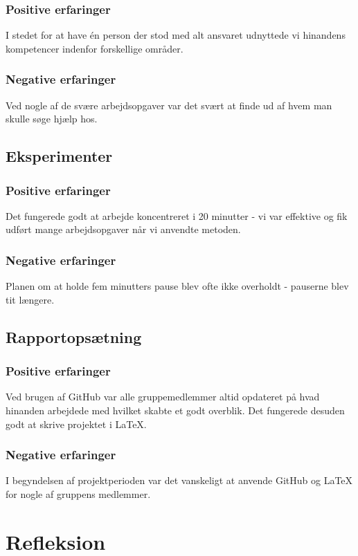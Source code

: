 \subsubsection{Positive erfaringer}
I stedet for at have én person der stod med alt ansvaret udnyttede vi hinandens kompetencer indenfor forskellige områder.

\subsubsection{Negative erfaringer}
Ved nogle af de svære arbejdsopgaver var det svært at finde ud af hvem man skulle søge hjælp hos.

\subsection{Eksperimenter}

\subsubsection{Positive erfaringer}
Det fungerede godt at arbejde koncentreret i 20 minutter - vi var effektive og fik udført mange arbejdsopgaver når vi anvendte metoden.

\subsubsection{Negative erfaringer}
Planen om at holde fem minutters pause blev ofte ikke overholdt - pauserne blev tit længere.

\subsection{Rapportopsætning}

\subsubsection{Positive erfaringer}
Ved brugen af GitHub var alle gruppemedlemmer altid opdateret på hvad hinanden arbejdede med hvilket skabte et godt overblik. Det fungerede desuden godt at skrive projektet i LaTeX.

\subsubsection{Negative erfaringer}
I begyndelsen af projektperioden var det vanskeligt at anvende GitHub og LaTeX for nogle af gruppens medlemmer. 

\section{Refleksion}
